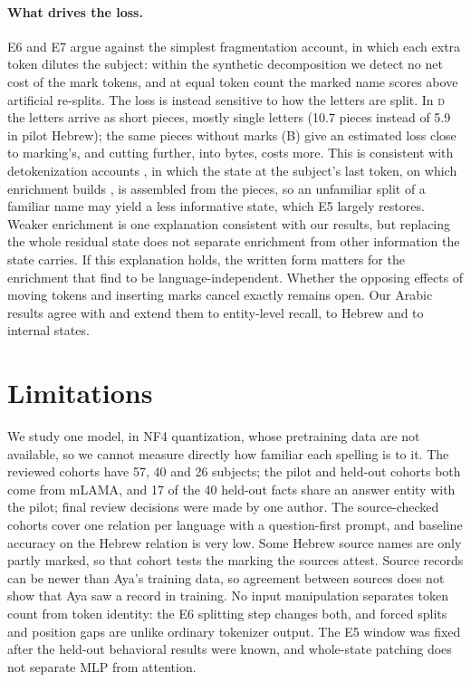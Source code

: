 \documentclass[11pt]{article}
\newcommand{\D}{\textsc{d}}
\newcommand{\cB}{\textsf{B}}
\begin{document}
\paragraph{What drives the loss.} E6 and E7 argue against the simplest
fragmentation account, in which each extra token dilutes the subject: within the
synthetic decomposition we detect no net cost of the mark tokens, and at equal
token count the marked name scores above artificial re-splits. The loss is
instead sensitive to how the letters are split. In \D{} the letters arrive
as short pieces, mostly single letters (10.7 pieces instead of 5.9 in pilot
Hebrew); the same pieces without marks (\cB) give an estimated loss close to
marking's, and cutting further, into bytes, costs more. This is consistent with
detokenization accounts \citep{kaplan-etal-2025-tokens,feucht-etal-2024-token},
in which the state at the subject's last token, on which enrichment builds
\citep{geva-etal-2023-dissecting}, is assembled from the pieces, so an unfamiliar
split of a familiar name may yield a less informative state, which E5 largely
restores. Weaker enrichment is one explanation consistent with our results, but
replacing the whole residual state does not separate enrichment from other
information the state carries. If this explanation holds, the written form
matters for the enrichment that \citet{fierro-etal-2025-multilingual} find to be
language-independent. Whether the opposing effects of moving tokens and
inserting marks cancel exactly remains open. Our Arabic results agree with
\citet{inoue-etal-2026-diacritics} and extend them to entity-level recall, to
Hebrew and to internal states.

\section{Limitations}
\label{sec:limits}
We study one model, in NF4 quantization, whose pretraining data are not
available, so we cannot measure directly how familiar each spelling is to it.
The reviewed cohorts have 57, 40 and 26 subjects; the pilot and held-out cohorts
both come from mLAMA, and 17 of the 40 held-out facts share an answer entity with
the pilot; final review decisions were made by one author. The source-checked cohorts cover one relation per language with a
question-first prompt, and baseline accuracy on the Hebrew relation is very low. Some
Hebrew source names are only partly marked, so that cohort tests the marking the
sources attest. Source records can be newer than Aya's training
data, so agreement between sources does not show that Aya saw a record in
training. No input manipulation
separates token count from token identity: the E6 splitting step changes both,
and forced splits and position gaps are unlike ordinary tokenizer output. The E5 window was fixed after the held-out behavioral results were
known, and whole-state patching does not separate MLP from attention.
\end{document}
